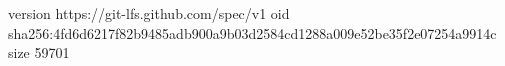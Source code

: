 version https://git-lfs.github.com/spec/v1
oid sha256:4fd6d6217f82b9485adb900a9b03d2584cd1288a009e52be35f2e07254a9914c
size 59701
